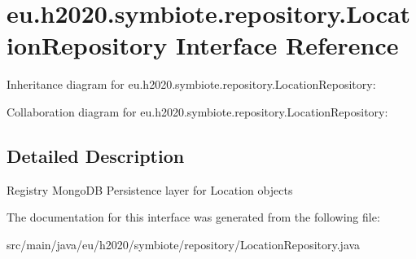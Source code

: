 \hypertarget{interfaceeu_1_1h2020_1_1symbiote_1_1repository_1_1LocationRepository}{}\section{eu.\+h2020.\+symbiote.\+repository.\+Location\+Repository Interface Reference}
\label{interfaceeu_1_1h2020_1_1symbiote_1_1repository_1_1LocationRepository}


Inheritance diagram for eu.\+h2020.\+symbiote.\+repository.\+Location\+Repository\+:


Collaboration diagram for eu.\+h2020.\+symbiote.\+repository.\+Location\+Repository\+:


\subsection{Detailed Description}
Registry Mongo\+DB Persistence layer for Location objects 

The documentation for this interface was generated from the following file\+:\begin{DoxyCompactItemize}
\item 
src/main/java/eu/h2020/symbiote/repository/Location\+Repository.\+java\end{DoxyCompactItemize}
